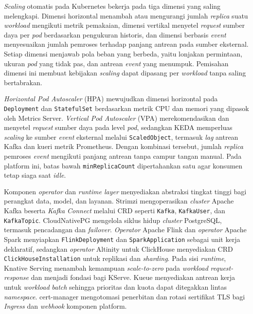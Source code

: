 \textit{Scaling} otomatis pada Kubernetes bekerja pada tiga dimensi yang saling melengkapi. Dimensi horizontal menambah atau mengurangi jumlah \textit{replica} suatu \textit{workload} mengikuti metrik pemakaian, dimensi vertikal menyetel \textit{request} sumber daya per \textit{pod} berdasarkan pengukuran historis, dan dimensi berbasis \textit{event} menyesuaikan jumlah pemroses terhadap panjang antrean pada sumber eksternal. Setiap dimensi menjawab pola beban yang berbeda, yaitu lonjakan permintaan, ukuran \textit{pod} yang tidak pas, dan antrean \textit{event} yang menumpuk. Pemisahan dimensi ini membuat kebijakan \textit{scaling} dapat dipasang per \textit{workload} tanpa saling bertabrakan.

\textit{Horizontal Pod Autoscaler} (HPA) mewujudkan dimensi horizontal pada \texttt{Deployment} dan \texttt{StatefulSet} berdasarkan metrik CPU dan memori yang dipasok oleh Metrics Server. \textit{Vertical Pod Autoscaler} (VPA) \autocite{vpa2025} merekomendasikan dan menyetel \textit{request} sumber daya pada level \textit{pod}, sedangkan KEDA \autocite{keda2025} memperluas \textit{scaling} ke sumber \textit{event} eksternal melalui \texttt{ScaledObject}, termasuk \textit{lag} antrean Kafka dan kueri metrik Prometheus. Dengan kombinasi tersebut, jumlah \textit{replica} pemroses \textit{event} mengikuti panjang antrean tanpa campur tangan manual. Pada platform ini, batas bawah \texttt{minReplicaCount} dipertahankan satu agar konsumen tetap siaga saat \textit{idle}.

Komponen \textit{operator} dan \textit{runtime layer} menyediakan abstraksi tingkat tinggi bagi perangkat data, model, dan layanan. Strimzi \autocite{strimzi2025} mengoperasikan \textit{cluster} Apache Kafka beserta \textit{Kafka Connect} melalui CRD seperti \texttt{Kafka}, \texttt{KafkaUser}, dan \texttt{KafkaTopic}. CloudNativePG \autocite{cnpg2025} mengelola siklus hidup \textit{cluster} PostgreSQL, termasuk pencadangan dan \textit{failover}. \textit{Operator} Apache Flink \autocite{flinkoperator2025} dan \textit{operator} Apache Spark \autocite{sparkoperator2025} menyiapkan \texttt{FlinkDeployment} dan \texttt{SparkApplication} sebagai unit kerja deklaratif, sedangkan \textit{operator} Altinity untuk ClickHouse \autocite{clickhouseoperator2025} menyediakan CRD \texttt{ClickHouseInstallation} untuk replikasi dan \textit{sharding}. Pada sisi \textit{runtime}, Knative Serving \autocite{knative2025} menambah kemampuan \textit{scale-to-zero} pada \textit{workload} \textit{request-response} dan menjadi fondasi bagi KServe. Kueue \autocite{kueue2024} menyediakan antrean kerja untuk \textit{workload} \textit{batch} sehingga prioritas dan kuota dapat ditegakkan lintas \textit{namespace}. cert-manager \autocite{certmanager2025} mengotomasi penerbitan dan rotasi sertifikat TLS bagi \textit{Ingress} dan \textit{webhook} komponen platform.

